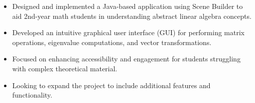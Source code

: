 \documentclass[10pt, letterpaper]{article}
\newenvironment{highlights}{
    \begin{itemize}[
        topsep=0.10 cm,
        parsep=0.10 cm,
        partopsep=0pt,
        itemsep=0pt,
        leftmargin=0.4 cm + 10pt
    ]
}{
    \end{itemize}
} %
\newenvironment{onecolentry}{
    \begin{adjustwidth}{
        0.2 cm + 0.00001 cm
    }{
        0.2 cm + 0.00001 cm
    }
}{
    \end{adjustwidth}
} %
\newenvironment{twocolentry}[2][]{
    \onecolentry
    \def\secondColumn{#2}
    \setcolumnwidth{\fill, 4.5 cm}
    \begin{paracol}{2}
}{
    \switchcolumn \raggedleft \secondColumn
    \end{paracol}
    \endonecolentry
} %
\let\hrefWithoutArrow\href
\renewcommand{\href}[2]{\hrefWithoutArrow{#1}{\ifthenelse{\equal{#2}{}}{ }{#2 }\raisebox{.15ex}{\footnotesize \faExternalLink*}}}
\begin{document}
\vspace{0.1cm}
\begin{highlights}
    \item Designed and implemented a Java-based application using Scene Builder to aid 2nd-year math students in understanding abstract linear algebra concepts.
    \item Developed an intuitive graphical user interface (GUI) for performing matrix operations, eigenvalue computations, and vector transformations.
    \item Focused on enhancing accessibility and engagement for students struggling with complex theoretical material.
    \item Looking to expand the project to include additional features and functionality.
\end{highlights}















\end{document}
